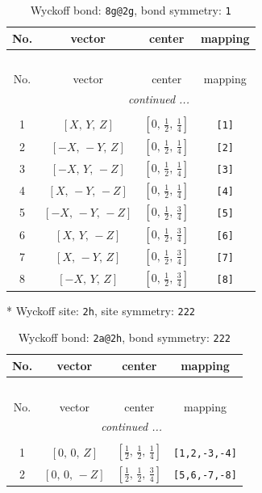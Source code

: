 \documentclass[fleqn,8pt]{jsarticle}
\begin{document}
\begin{longtable}{cccc}
\caption{Wyckoff bond: {\tt 8g@2g}, bond symmetry: {\tt 1}}
 \\
 \hline \hline
No. & vector & center & mapping \\ \hline \endfirsthead

\multicolumn{3}{l}{\tablename\ \thetable{}} \\
 \hline \hline
No. & vector & center & mapping \\ \hline \endhead

 \hline \hline
\multicolumn{3}{r}{\footnotesize\it continued ...} \\ \endfoot

 \hline \hline
\multicolumn{3}{r}{} \\ \endlastfoot

1 & $\left[ X,\, Y,\, Z \right]$ & $\left[ 0,\, \frac{1}{2},\, \frac{1}{4} \right]$ & {\tt [1]} \\ \hline
2 & $\left[ - X,\, - Y,\, Z \right]$ & $\left[ 0,\, \frac{1}{2},\, \frac{1}{4} \right]$ & {\tt [2]} \\ \hline
3 & $\left[ - X,\, Y,\, - Z \right]$ & $\left[ 0,\, \frac{1}{2},\, \frac{1}{4} \right]$ & {\tt [3]} \\ \hline
4 & $\left[ X,\, - Y,\, - Z \right]$ & $\left[ 0,\, \frac{1}{2},\, \frac{1}{4} \right]$ & {\tt [4]} \\ \hline
5 & $\left[ - X,\, - Y,\, - Z \right]$ & $\left[ 0,\, \frac{1}{2},\, \frac{3}{4} \right]$ & {\tt [5]} \\ \hline
6 & $\left[ X,\, Y,\, - Z \right]$ & $\left[ 0,\, \frac{1}{2},\, \frac{3}{4} \right]$ & {\tt [6]} \\ \hline
7 & $\left[ X,\, - Y,\, Z \right]$ & $\left[ 0,\, \frac{1}{2},\, \frac{3}{4} \right]$ & {\tt [7]} \\ \hline
8 & $\left[ - X,\, Y,\, Z \right]$ & $\left[ 0,\, \frac{1}{2},\, \frac{3}{4} \right]$ & {\tt [8]} \\
\end{longtable}
* Wyckoff site: {\tt 2h}, site symmetry: {\tt 222}
\renewcommand{\arraystretch}{1.2}
\begin{longtable}{cccc}
\caption{Wyckoff bond: {\tt 2a@2h}, bond symmetry: {\tt 222}}
 \\
 \hline \hline
No. & vector & center & mapping \\ \hline \endfirsthead

\multicolumn{3}{l}{\tablename\ \thetable{}} \\
 \hline \hline
No. & vector & center & mapping \\ \hline \endhead

 \hline \hline
\multicolumn{3}{r}{\footnotesize\it continued ...} \\ \endfoot

 \hline \hline
\multicolumn{3}{r}{} \\ \endlastfoot

1 & $\left[ 0,\, 0,\, Z \right]$ & $\left[ \frac{1}{2},\, \frac{1}{2},\, \frac{1}{4} \right]$ & {\tt [1,2,-3,-4]} \\ \hline
2 & $\left[ 0,\, 0,\, - Z \right]$ & $\left[ \frac{1}{2},\, \frac{1}{2},\, \frac{3}{4} \right]$ & {\tt [5,6,-7,-8]} \\
\end{longtable}
\end{document}
